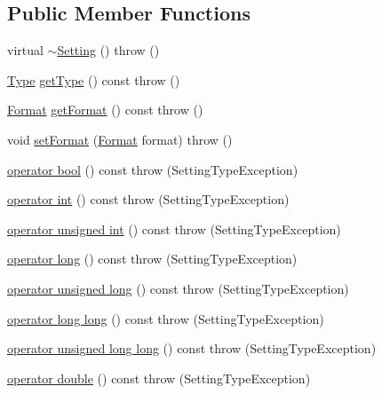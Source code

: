 \subsection*{Public Member Functions}
\begin{DoxyCompactItemize}
\item 
virtual \hyperlink{classlibconfig_1_1Setting_a0bbd671a6c8581a6cb1dc1ade1459ba2}{$\sim$\-Setting} ()  throw ()
\item 
\hyperlink{classlibconfig_1_1Setting_a42f760ff88654e784477a6f040267bb4}{Type} \hyperlink{classlibconfig_1_1Setting_a729cf1d7d90b5dca9eebde2bda9176f5}{get\-Type} () const   throw ()
\item 
\hyperlink{classlibconfig_1_1Setting_a35034c3fd8c1b2e8e590b6f53083106e}{Format} \hyperlink{classlibconfig_1_1Setting_a09b1a13a09680ff220bb5aef3e378d89}{get\-Format} () const   throw ()
\item 
void \hyperlink{classlibconfig_1_1Setting_aa3d550a5658d40655113497a17c9d282}{set\-Format} (\hyperlink{classlibconfig_1_1Setting_a35034c3fd8c1b2e8e590b6f53083106e}{Format} format)  throw ()
\item 
\hyperlink{classlibconfig_1_1Setting_ad8adda53b1f1021da61d00e27637a88f}{operator bool} () const   throw (\-Setting\-Type\-Exception)
\item 
\hyperlink{classlibconfig_1_1Setting_abc59b9a6df51024d52970f0ee10d4f1f}{operator int} () const   throw (\-Setting\-Type\-Exception)
\item 
\hyperlink{classlibconfig_1_1Setting_a9cc112e6bfab4902355fafe9ae8babac}{operator unsigned int} () const   throw (\-Setting\-Type\-Exception)
\item 
\hyperlink{classlibconfig_1_1Setting_a0ac82df2307935191fed61ea2430bed4}{operator long} () const   throw (\-Setting\-Type\-Exception)
\item 
\hyperlink{classlibconfig_1_1Setting_a0d6a7a8f1443d918478b9096590fe5ec}{operator unsigned long} () const   throw (\-Setting\-Type\-Exception)
\item 
\hyperlink{classlibconfig_1_1Setting_abd5bac17fa972df2d4b909594325134f}{operator long long} () const   throw (\-Setting\-Type\-Exception)
\item 
\hyperlink{classlibconfig_1_1Setting_a4a297e1c19d6d37d0ba067ba892d86ea}{operator unsigned long long} () const   throw (\-Setting\-Type\-Exception)
\item 
\hyperlink{classlibconfig_1_1Setting_a79a41bbda6c9cd9f50c5820032424874}{operator double} () const   throw (\-Setting\-Type\-Exception)
\item 

\end{DoxyCompactItemize}
